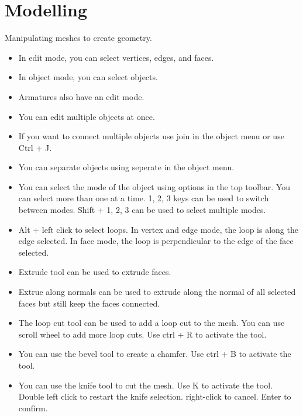 \documentclass[12pt]{article}
\begin{document}
\section{Modelling}
Manipulating meshes to create geometry.
\begin{itemize}
    \item In edit mode, you can select vertices, edges, and faces.
    \item In object mode, you can select objects.
    \item Armatures also have an edit mode.
    \item You can edit multiple objects at once.
    \item If you want to connect multiple objects use join in the object menu or use Ctrl + J.
    \item You can separate objects using seperate in the object menu.
    \item You can select the mode of the object using options in the top toolbar. You can select more than one at a time. 1, 2, 3 keys can be used to switch between modes. Shift + 1, 2, 3 can be used to select multiple modes.
    \item Alt + left click to select loops. In vertex and edge mode, the loop is along the edge selected. In face mode, the loop is perpendicular to the edge of the face selected.
    \item Extrude tool can be used to extrude faces.
    \item Extrue along normals can be used to extrude along the normal of all selected faces but still keep the faces connected.
    \item The loop cut tool can be used to add a loop cut to the mesh. You can use scroll wheel to add more loop cuts. Use ctrl + R to activate the tool.
    \item You can use the bevel tool to create a chamfer. Use ctrl + B to activate the tool.
    \item You can use the knife tool to cut the mesh. Use K to activate the tool. Double left click to restart the knife selection. right-click to cancel. Enter to confirm.
\end{itemize}
\end{document}
